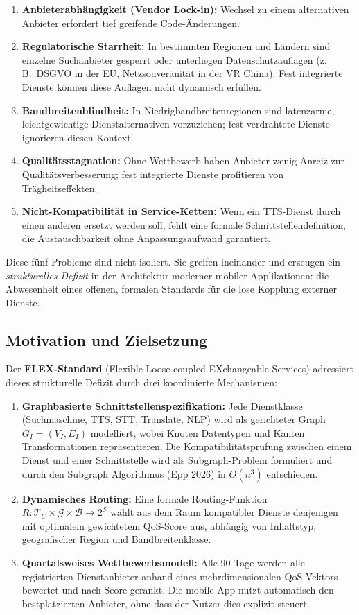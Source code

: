 ﻿\documentclass[a4paper,12pt]{article}
\theoremstyle{definition}
\begin{document}
\begin{enumerate}
    \item \textbf{Anbieterabhängigkeit (Vendor Lock-in):} Wechsel zu einem alternativen Anbieter erfordert tief greifende Code-Änderungen.
    \item \textbf{Regulatorische Starrheit:} In bestimmten Regionen und Ländern sind einzelne Suchanbieter gesperrt oder unterliegen Datenschutzauflagen (z.\,B.\ DSGVO in der EU, Netzsouveränität in der VR China). Fest integrierte Dienste können diese Auflagen nicht dynamisch erfüllen.
    \item \textbf{Bandbreitenblindheit:} In Niedrigbandbreitenregionen sind latenzarme, leichtgewichtige Dienstalternativen vorzuziehen; fest verdrahtete Dienste ignorieren diesen Kontext.
    \item \textbf{Qualitätsstagnation:} Ohne Wettbewerb haben Anbieter wenig Anreiz zur Qualitätsverbesserung; fest integrierte Dienste profitieren von Trägheitseffekten.
    \item \textbf{Nicht-Kompatibilität in Service-Ketten:} Wenn ein TTS-Dienst durch einen anderen ersetzt werden soll, fehlt eine formale Schnittstellendefinition, die Austauschbarkeit ohne Anpassungsaufwand garantiert.
\end{enumerate}

Diese fünf Probleme sind nicht isoliert. Sie greifen ineinander und erzeugen ein \emph{strukturelles Defizit} in der Architektur moderner mobiler Applikationen: die Abwesenheit eines offenen, formalen Standards für die lose Kopplung externer Dienste.

\subsection{Motivation und Zielsetzung}

Der \textbf{FLEX-Standard} (Flexible Loose-coupled EXchangeable Services) adressiert dieses strukturelle Defizit durch drei koordinierte Mechanismen:

\begin{enumerate}
    \item \textbf{Graphbasierte Schnittstellenspezifikation:} Jede Dienstklasse (Suchmaschine, TTS, STT, Translate, NLP) wird als gerichteter Graph $G_I = (V_I, E_I)$ modelliert, wobei Knoten Datentypen und Kanten Transformationen repräsentieren. Die Kompatibilitätsprüfung zwischen einem Dienst und einer Schnittstelle wird als Subgraph-Problem formuliert und durch den Subgraph Algorithmus (Epp 2026) in $O(n^3)$ entschieden.
    \item \textbf{Dynamisches Routing:} Eine formale Routing-Funktion $R: \mathcal{T}_C \times \mathcal{G} \times \mathcal{B} \to 2^{\mathcal{S}}$ wählt aus dem Raum kompatibler Dienste denjenigen mit optimalem gewichtetem QoS-Score aus, abhängig von Inhaltstyp, geografischer Region und Bandbreitenklasse.
    \item \textbf{Quartalsweises Wettbewerbsmodell:} Alle 90 Tage werden alle registrierten Dienstanbieter anhand eines mehrdimensionalen QoS-Vektors bewertet und nach Score gerankt. Die mobile App nutzt automatisch den bestplatzierten Anbieter, ohne dass der Nutzer dies explizit steuert.
\end{enumerate}
\end{document}
